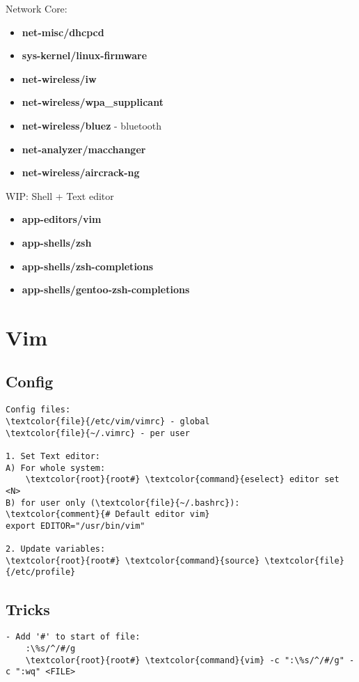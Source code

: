 \documentclass[10pt, a4paper, onecolumn, openany]{book}         %
\begin{document}
Network Core:
\begin{itemize}
    \item \textbf{net-misc/dhcpcd}
    \item \textbf{sys-kernel/linux-firmware}
    \item \textbf{net-wireless/iw}
    \item \textbf{net-wireless/wpa\_supplicant}
    \item \textbf{net-wireless/bluez} - bluetooth
    \item \textbf{net-analyzer/macchanger}
    \item \textbf{net-wireless/aircrack-ng}
\end{itemize}
WIP:
Shell + Text editor
\begin{itemize}
    \item \textbf{app-editors/vim}
    \item \textbf{app-shells/zsh}
    \item \textbf{app-shells/zsh-completions}
    \item \textbf{app-shells/gentoo-zsh-completions}
\end{itemize}


\section{Vim}
\subsection{Config}
\begin{Verbatim}[commandchars=\\\{\}]
Config files:
\textcolor{file}{/etc/vim/vimrc} - global
\textcolor{file}{~/.vimrc} - per user

1. Set Text editor:
A) For whole system:
    \textcolor{root}{root#} \textcolor{command}{eselect} editor set <N>
B) for user only (\textcolor{file}{~/.bashrc}):
\textcolor{comment}{# Default editor vim}
export EDITOR="/usr/bin/vim"

2. Update variables:
\textcolor{root}{root#} \textcolor{command}{source} \textcolor{file}{/etc/profile}
\end{Verbatim}
\subsection{Tricks}
\begin{Verbatim}[commandchars=\\\{\}]
- Add '#' to start of file:
    :\%s/^/#/g
    \textcolor{root}{root#} \textcolor{command}{vim} -c ":\%s/^/#/g" -c ":wq" <FILE>
\end{Verbatim}
\end{document}
